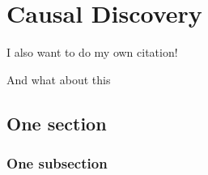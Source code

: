 \chapter{Causal Discovery}

I also want to do my own citation! \cite{Peters2017}

And what about this \cite{Mooij2016jmlr}

\lipsum[7]

\section{One section}

\lipsum[3]

\subsection{One subsection}

\lipsum[3]
